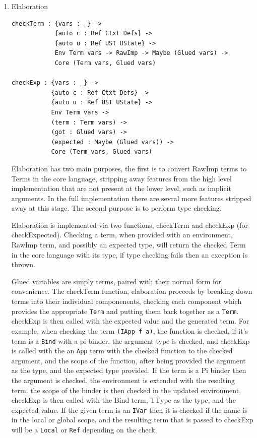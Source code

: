 \documentclass[a4paper]{article}
\begin{document}
\begin{enumerate}
\item Elaboration
\label{sec:org983abcc}
\begin{center}
\begin{verbatim}
checkTerm : {vars : _} ->
			{auto c : Ref Ctxt Defs} ->
			{auto u : Ref UST UState} ->
			Env Term vars -> RawImp -> Maybe (Glued vars) ->
			Core (Term vars, Glued vars)

checkExp : {vars : _} ->
		   {auto c : Ref Ctxt Defs} ->
		   {auto u : Ref UST UState} ->
		   Env Term vars ->
		   (term : Term vars) ->
		   (got : Glued vars) ->
		   (expected : Maybe (Glued vars)) ->
		   Core (Term vars, Glued vars)
\end{verbatim}
\end{center}

Elaboration has two main purposes, the first is to convert RawImp terms
to Terms in the core language, stripping away features from the high 
level implementation that are not present at the lower level, such as 
implicit arguments. In the full implementation there are sevral more 
features stripped away at this stage. The second purpose is to perform 
type checking.  

Elaboration is implemented via two functions, checkTerm and checkExp
(for checkExpected). Checking a term, when provided with an environment,
RawImp term, and possibly an expected type, will return the checked 
Term in the core language with its type, if type checking fails then an
exception is thrown. 

Glued variables are simply terms, paired with their normal form for 
convenience. The checkTerm function, elaboration proceeds by breaking
down terms into their individual componenents, checking each component
which provides the appropriate \texttt{Term} and putting them back together as
a \texttt{Term}. checkExp is then called with the expected value and the 
generated term. For example, when checking the term \texttt{(IApp f a)}, 
the function is checked, if it's term is a \texttt{Bind} with a pi binder, 
the argument type is checked, and checkExp is called with the an \texttt{App} 
term with the checked function to the checked argument, and the scope
of the function, after being provided the argument as the type, 
and the expected type provided. If the term is a Pi binder then the 
argument is checked, the environment is extended with the resulting 
term, the scope of the binder is then checked in the updated 
environment, checkExp is then called with the Bind term, TType as the 
type, and the expected value. If the given term is an \texttt{IVar} 
then it is checked if the name is in the local or global scope, and the
resulting term that is passed to checkExp will be a \texttt{Local} or \texttt{Ref} 
depending on the check.


\end{enumerate}
\end{document}
